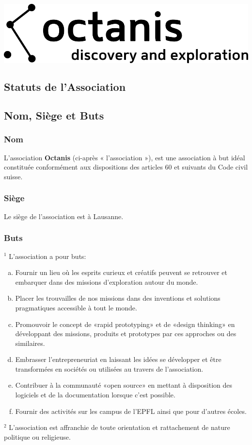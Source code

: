 \documentclass[12pt,a4paper,oneside]{article}
\newcounter{art}
\newcommand{\french}{    \switchcolumn[1]\noindent}
\newcounter{para}
\begin{document}
\begin{center}
	\includegraphics{octanis_org_logo_large}
\end{center}

\begin{paracol}{2}\sloppy

\french
	\section*{Statuts de l’Association}


\french
	\subsection{Nom, Siège et Buts}
	\subsubsection{Nom}
	L’association \textbf{Octanis} (ci-après « l’association »), est une association à but idéal constituée conformément aux dispositions des articles 60 et suivants du Code civil suisse.


\french
	\subsubsection{Siège}
	Le siège de l’association est à Lausanne.


\french
	\subsubsection{Buts}
	$^1$ L’association a pour buts:
	\begin{enumerate}[(a)]
		\item Fournir un lieu où les esprits curieux et créatifs peuvent se retrouver et embarquer dans des missions d’exploration autour du monde.
		\item Placer les trouvailles de nos missions dans des inventions et solutions pragmatiques accessible à tout le monde.
		\item Promouvoir le concept de «rapid prototyping» et de «design thinking» en développant des missions, produits et prototypes par ces approches ou des similaires.
		\item Embrasser l’entrepreneuriat en laissant les idées se développer et être transformées en sociétés ou utilisées au travers de l’association.
		\item Contribuer à la communauté «open source» en mettant à disposition des logiciels et de la documentation lorsque c’est possible.
		\item Fournir des activités sur les campus de l’EPFL ainsi que pour d’autres écoles.
	\end{enumerate} 
	$^2$ L’association est affranchie de toute orientation et rattachement de nature politique ou religieuse.


\end{paracol}
\end{document}
